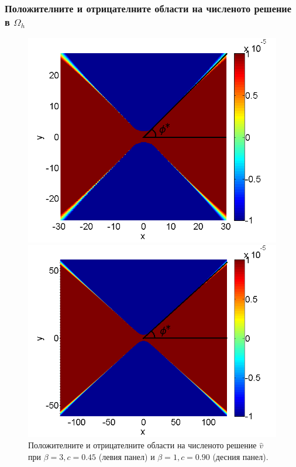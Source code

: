 \documentclass{article}
\theoremstyle{remark}
\begin{document}
\subsubsection{Положителните и отрицателните области на численото решение в $\Omega_h$ }
\begin{figure}[ht]
	\begin{minipage}[b]{0.46\linewidth}
		\raggedleft
		\includegraphics[width=\linewidth]{NewBoundaryCondition/PosNeg_bt3_c045.png}
	\end{minipage}	
	\begin{minipage}[b]{0.49\linewidth}
		\raggedright
		 \includegraphics[width=\linewidth]{NewBoundaryCondition/PosNeg_bt1_c090.png}
	\end{minipage}
	\caption{Положителните и отрицателните области на численото решение $\widehat v$ при $\beta = 3, c=0.45$ (левия панел) и $\beta = 1, c=0.90$ (десния панел). }
	\label{fig:posNegDom}
\end{figure}
\end{document}
